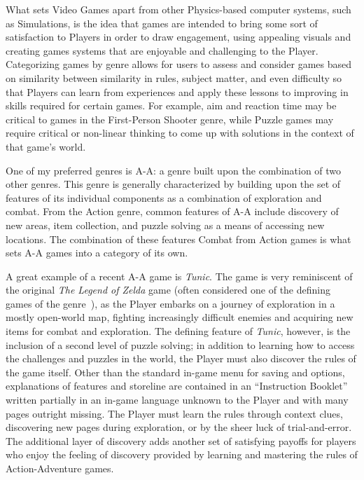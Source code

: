 What sets Video Games apart from other Physics-based computer systems, such as Simulations, is the idea that games are intended to bring some sort of satisfaction to Players in order to draw engagement, using appealing visuals and creating games systems that are enjoyable and challenging to the Player. Categorizing games by genre allows for users to assess and consider games based on similarity between similarity in rules, subject matter, and even difficulty so that Players can learn from experiences and apply these lessons to improving in skills required for certain games. For example, aim and reaction time may be critical to games in the First-Person Shooter genre, while Puzzle games may require critical or non-linear thinking to come up with solutions in the context of that game's world.

One of my preferred genres is \ac{A-A}: a genre built upon the combination of two other genres. This genre is generally characterized by building upon the set of features of its individual components as a combination of exploration and combat. From the Action genre, common features of \ac{A-A} include discovery of new areas, item collection, and puzzle solving as a means of accessing new locations. The combination of these features Combat from Action games is what sets \ac{A-A} games into a category of its own.

A great example of a recent \ac{A-A} game is \textit{Tunic}. The game is very reminiscent of the original \textit{The Legend of Zelda} game (often considered one of the defining games of the genre~\cite{b4}), as the Player embarks on a journey of exploration in a mostly open-world map, fighting increasingly difficult enemies and acquiring new items for combat and exploration. The defining feature of \textit{Tunic}, however, is the inclusion of a second level of puzzle solving; in addition to learning how to access the challenges and puzzles in the world, the Player must also discover the rules of the game itself. Other than the standard in-game menu for saving and options, explanations of features and storeline are contained in an ``Instruction Booklet'' written partially in an in-game language unknown to the Player and with many pages outright missing. The Player must learn the rules through context clues, discovering new pages during exploration, or by the sheer luck of trial-and-error. The additional layer of discovery adds another set of satisfying payoffs for players who enjoy the feeling of discovery provided by learning and mastering the rules of Action-Adventure games.

